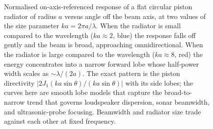 \begin{figure}[htbp]
\centering
{}
\caption[Directivity of a circular piston]{Normalised on-axis-referenced
response of a flat circular piston radiator of radius $a$ versus angle
off the beam axis, at two values of the size parameter $ka=2\pi
a/\lambda$. When the radiator is small compared to the wavelength
($ka\approx2$, blue) the response falls off gently and the beam is
broad, approaching omnidirectional. When the radiator is large compared
to the wavelength ($ka\approx8$, red) the energy concentrates into a
narrow forward lobe whose half-power width scales as $\sim\lambda/(2a)$.
The exact pattern is the piston directivity $|2J_1(ka\sin\theta)/(ka
\sin\theta)|$ with its side lobes; the curves here are smooth lobe
models that capture the broad-to-narrow trend that governs loudspeaker
dispersion, sonar beamwidth, and ultrasonic-probe focusing. Beamwidth
and radiator size trade against each other at fixed frequency.}
\label{fig:vol03ch07:directivity}
\end{figure}
